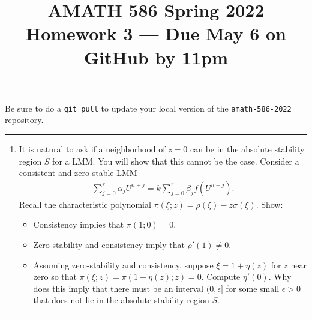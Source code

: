 \documentclass[10pt]{amsart}
\begin{document}
\pagestyle{empty}

\newcommand{\mline}{\vspace{.2in}\hrule\vspace{.2in}}


\title{\bf { AMATH 586 Spring 2022 \\ Homework 3 ---
Due May 6 on GitHub by 11pm} }
\maketitle
\centerline{Be sure to do a {\tt git pull} to update your local version of the {\tt amath-586-2022} repository.}

\mline
\begin{enumerate}[label={\bf Problem~{\arabic*}:}]
\item It is natural to ask if a neighborhood of $z = 0$ can be in the absolute stability region $S$ for a LMM.  You will show that this cannot be the case.  Consider a consistent and zero-stable LMM
  \begin{align*}
    \sum_{j=0}^r \alpha_j U^{n+j} = k \sum_{j=0}^r \beta_j f(U^{n+j}).
  \end{align*}
  Recall the characteristic polynomial $\pi(\xi;z) = \rho(\xi) - z \sigma(\xi)$. Show:
  \begin{itemize}
  \item Consistency implies that $\pi(1;0) = 0$.
  \item Zero-stability and consistency imply that $\rho'(1) \neq 0$.
  \item Assuming zero-stability and consistency, suppose $\xi = 1 + \eta(z)$ for $z$ near zero so that $\pi(\xi;z) = \pi(1 + \eta(z);z) = 0$.  Compute $\eta'(0)$.  Why does this imply that there must be an interval $(0,\epsilon]$ for some small $\epsilon > 0$ that does not lie in the absolute stability region $S$.  
  \end{itemize}

  \mline
  

\end{enumerate}
\end{document}
